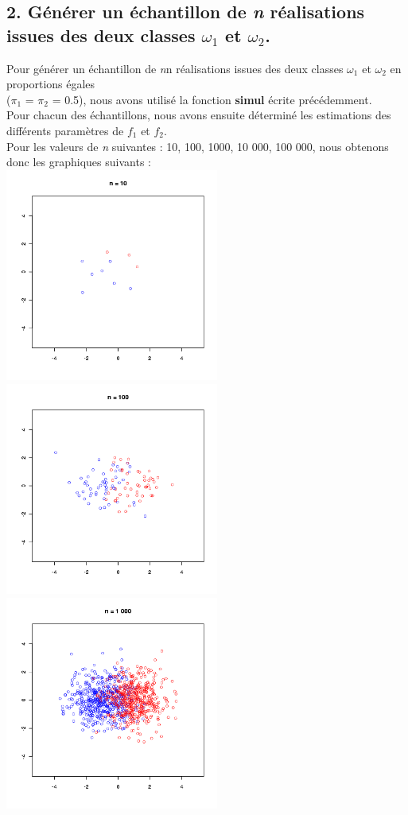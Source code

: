 \documentclass[a4paper, 10pt]{article}
\begin{document}
\subsection*{2. Générer un échantillon de \textit{n} réalisations issues des deux classes $\omega_{1}$ et $\omega_{2}$.}
Pour générer un échantillon de \textit{n}n réalisations issues des deux classes $\omega_{1}$ et $\omega_{2}$ en proportions égales\\
($\pi_{1}$ = $\pi_{2}$ = 0.5), nous avons utilisé la fonction \textbf{simul} écrite précédemment.\\
Pour chacun des échantillons, nous avons ensuite déterminé les estimations des différents paramètres de \textit{$f_{1}$} et \textit{$f_{2}$}.\\
Pour les valeurs de \textit{n} suivantes : 10, 100, 1000, 10 000, 100 000, nous obtenons donc les graphiques suivants :\\
\includegraphics[height = 7cm, width = 7cm]{plots/plot_simul_6.png}
\includegraphics[height = 7cm, width = 7cm]{plots/plot_simul_7.png}\\
\includegraphics[height = 7cm, width = 7cm]{plots/plot_simul_8.png}
\end{document}

